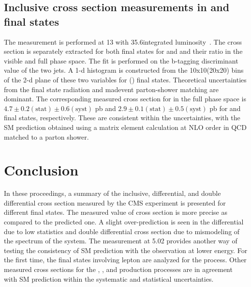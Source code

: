  \subsection{Inclusive \texorpdfstring{\ttbb}{ttbb} cross section measurements in \texorpdfstring{\ljets}{ljets} and \texorpdfstring{\dilep}{dilep} final states}
 The measurement is performed at 13 \TeV with 35.6\fbinv integrated luminosity~\cite{CMS:2020grm}. 
 The cross section is separately extracted for both final states for \ttbar and \ttjj and their ratio
 in the visible and full phase space. The fit is performed on the b-tagging discriminant value of 
 the two jets. A 1-d histogram is constructed from the 10x10(20x20) bins of the 2-d plane of these 
 two variables for \ljets (\dilep) final states. Theoretical uncertainties from the final state
 radiation and madevent parton-shower matching are dominant. The corresponding measured cross
 section for \ttbb in the full phase space is $4.7 \pm 0.2 (\text{stat}) \pm 0.6 (\text{syst})$ pb 
 and $2.9 \pm 0.1 (\text{stat}) \pm 0.5 (\text{syst})$ pb for \ljets and \dilep final states, 
 respectively. These are consistent within the uncertainties, with the SM prediction obtained using 
 a matrix element calculation at NLO order in QCD matched to a parton shower.

 \section{Conclusion}
 In these proceedings, a summary of the inclusive, differential, and double differential cross section
 measured by the CMS experiment is presented for different final states. The measured value of 
 \ttbar cross section is more precise as compared to the predicted one. A slight over-prediction
 is seen in the differential \ttgamma due to low statistics and double differential \ttbar cross 
 section due to mismodeling of the \pt spectrum of the \ttbar system. The \ttbar measurement at
 5.02 \TeV provides another way of testing the consistency of SM prediction with the observation
 at lower energy. For the first time, the final states involving \PGt lepton are analyzed for the
 \ttbar process. Other measured cross sections for the \tW, \ttgamma, \ttcc and \ttbb 
 production processes are in agreement with SM prediction within the systematic and statistical 
 uncertainties.

